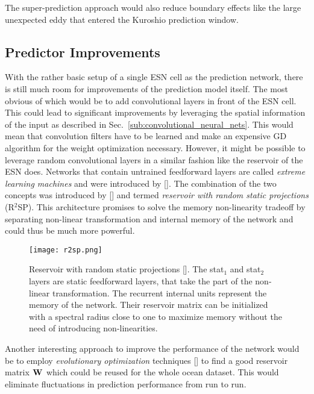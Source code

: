 The super-prediction approach would also reduce boundary effects like the
large unexpected eddy that entered the Kuroshio prediction window.


\subsection{Predictor Improvements}

With the rather basic setup of a single ESN cell as the prediction network,
there is still much room for improvements of the prediction model itself.  The
most obvious of which would be to add convolutional layers in front of the ESN
cell. This could lead to significant improvements by leveraging the spatial
information of the input as described in
Sec.~\ref{sub:convolutional_neural_nets}. This would mean that convolution
filters have to be learned and make an expensive GD algorithm for the weight
optimization necessary. However, it might be possible to leverage random
convolutional layers in a similar fashion like the reservoir of the ESN does.
Networks that contain untrained feedforward layers are called \emph{extreme
learning machines} and were introduced by [\cite{huang2006}].  The combination
of the two concepts was introduced by [\cite{butcher2013}] and termed
\emph{reservoir with random static projections} (R$^2$SP).  This architecture
promises to solve the memory non-linearity tradeoff by separating non-linear
transformation and internal memory of the network and could thus be much more
powerful.

\begin{figure}
  \centering
  \texttt{[image: r2sp.png]}
  \caption{Reservoir with random static projections [\cite{butcher2013}]. The
  stat$_1$ and stat$_2$ layers are static feedforward layers, that take the
  part of the non-linear transformation.  The recurrent internal units
  represent the memory of the network. Their reservoir matrix can be
  initialized with a spectral radius close to one to maximize memory without
  the need of introducing non-linearities.}
  \label{fig:r2sp}
\end{figure}

Another interesting approach to improve the performance of the network would be
to employ \emph{evolutionary optimization} techniques [\cite{fogel1997}] to find
a good reservoir matrix $\boldsymbol{\textbf{W}}^{\text{}}$ which could be reused for the whole ocean
dataset.  This would eliminate fluctuations in prediction performance from run
to run.


